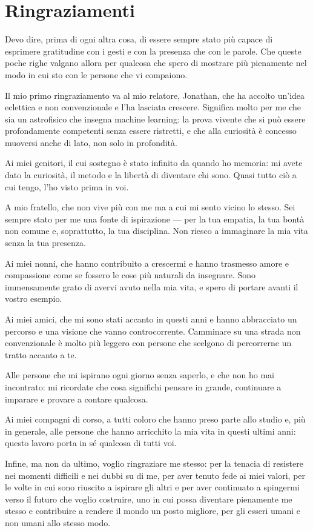 \chapter*{Ringraziamenti}

Devo dire, prima di ogni altra cosa, di essere sempre stato più capace di esprimere gratitudine con i gesti e con la presenza che con le parole. Che queste poche righe valgano allora per qualcosa che spero di mostrare più pienamente nel modo in cui sto con le persone che vi compaiono.

Il mio primo ringraziamento va al mio relatore, Jonathan, che ha accolto un'idea eclettica e non convenzionale e l'ha lasciata crescere. Significa molto per me che sia un astrofisico che insegna machine learning: la prova vivente che si può essere profondamente competenti senza essere ristretti, e che alla curiosità è concesso muoversi anche di lato, non solo in profondità.

Ai miei genitori, il cui sostegno è stato infinito da quando ho memoria: mi avete dato la curiosità, il metodo e la libertà di diventare chi sono. Quasi tutto ciò a cui tengo, l'ho visto prima in voi.

A mio fratello, che non vive più con me ma a cui mi sento vicino lo stesso. Sei sempre stato per me una fonte di ispirazione --- per la tua empatia, la tua bontà non comune e, soprattutto, la tua disciplina. Non riesco a immaginare la mia vita senza la tua presenza.

Ai miei nonni, che hanno contribuito a crescermi e hanno trasmesso amore e compassione come se fossero le cose più naturali da insegnare. Sono immensamente grato di avervi avuto nella mia vita, e spero di portare avanti il vostro esempio.

Ai miei amici, che mi sono stati accanto in questi anni e hanno abbracciato un percorso e una visione che vanno controcorrente. Camminare su una strada non convenzionale è molto più leggero con persone che scelgono di percorrerne un tratto accanto a te.

Alle persone che mi ispirano ogni giorno senza saperlo, e che non ho mai incontrato: mi ricordate che cosa significhi pensare in grande, continuare a imparare e provare a contare qualcosa.

Ai miei compagni di corso, a tutti coloro che hanno preso parte allo studio e, più in generale, alle persone che hanno arricchito la mia vita in questi ultimi anni: questo lavoro porta in sé qualcosa di tutti voi.

Infine, ma non da ultimo, voglio ringraziare me stesso: per la tenacia di resistere nei momenti difficili e nei dubbi su di me, per aver tenuto fede ai miei valori, per le volte in cui sono riuscito a ispirare gli altri e per aver continuato a spingermi verso il futuro che voglio costruire, uno in cui possa diventare pienamente me stesso e contribuire a rendere il mondo un posto migliore, per gli esseri umani e non umani allo stesso modo.

\cleardoublepage
